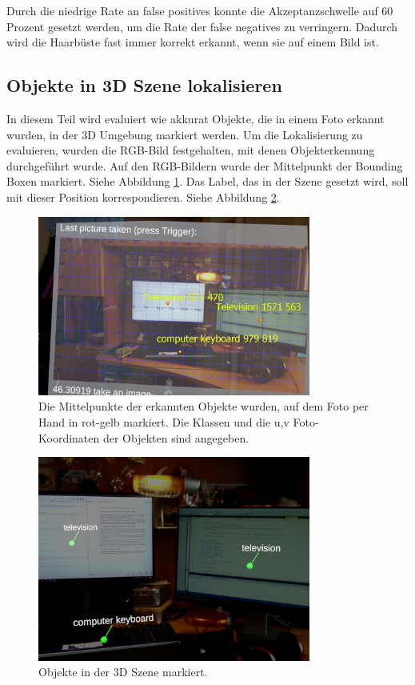 Durch die niedrige Rate an false positives konnte die Akzeptanzschwelle auf 60 Prozent gesetzt werden, um die Rate der false negatives zu verringern. Dadurch wird die Haarbüste fast immer korrekt erkannt, wenn sie auf einem Bild ist.


\subsection{Objekte in 3D Szene lokalisieren}

In diesem Teil wird evaluiert wie akkurat Objekte, die in einem Foto erkannt wurden, in der 3D Umgebung markiert werden.
Um die Lokalisierung zu evaluieren, wurden die RGB-Bild festgehalten, mit denen Objekterkennung durchgeführt wurde. Auf den RGB-Bildern wurde der Mittelpunkt der Bounding Boxen markiert. Siehe Abbildung \ref{img:markedonimage}. Das Label, das in der Szene gesetzt wird, soll mit dieser Position korrespondieren. Siehe Abbildung \ref{img:labelsszene}. 
\begin{figure}[H]
	\centering
	\includegraphics[width=0.8\textwidth]{images/ML_markedOnImage2.jpg}
	\caption[Erkennt Objekte auf RGB-Bilde markiert]{Die Mittelpunkte der erkannten Objekte wurden, auf dem Foto per Hand in rot-gelb markiert. Die Klassen und die u,v Foto-Koordinaten der Objekten sind angegeben.}
	\label{img:markedonimage}
\end{figure}

\begin{figure}[H]
	\centering
	\includegraphics[width=0.8\textwidth]{images/ML_20201014_13.39.00.jpg}
	\caption[Erkannte Objekte in der Szene markiert]{Objekte in der 3D Szene markiert.}
	\label{img:labelsszene}
\end{figure}

